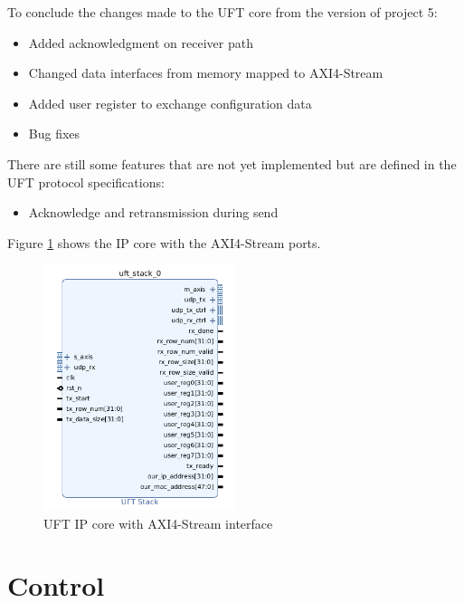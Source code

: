 To conclude the changes made to the UFT core from the version of project 5:
\begin{itemize}
  \item Added acknowledgment on receiver path
  \item Changed data interfaces from memory mapped to AXI4-Stream
  \item Added user register to exchange configuration data
  \item Bug fixes
\end{itemize}

There are still some features that are not yet implemented but are defined in
the UFT protocol specifications:
\begin{itemize}
  \item Acknowledge and retransmission during send
\end{itemize}

Figure \ref{fig:uftipcoreaxistream} shows the IP core with the AXI4-Stream
ports.

\begin{figure}[b!]
    \centering
    \includegraphics[width=0.5\textwidth] {images/dataflow/uftcorestream.png}
    \caption{UFT IP core with AXI4-Stream interface}
    \label{fig:uftipcoreaxistream}
\end{figure}
\section{Control} \label{ch:control}

